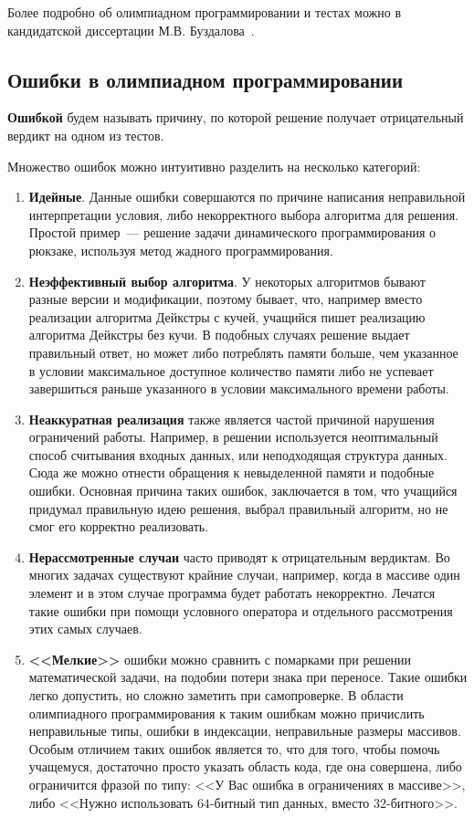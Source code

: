Более подробно об олимпиадном программировании и тестах можно в кандидатской 
диссертации М.В. Буздалова~\cite{buzdalov-diss}.

\subsection{Ошибки в олимпиадном программировании}


\textbf{Ошибкой} будем называть причину, по которой решение получает отрицательный вердикт на одном из тестов.

Множество ошибок можно интуитивно разделить на несколько категорий:
\begin{enumerate}
    \item \textbf{Идейные}. Данные ошибки совершаются по причине написания неправильной интерпретации условия,
        либо некорректного выбора алгоритма для решения. Простой пример~--- решение задачи динамического программирования 
        о рюкзаке, используя метод жадного программирования. 
    \item \textbf{Неэффективный выбор алгоритма}. У некоторых алгоритмов бывают разные версии и модификации,
        поэтому бывает, что, например вместо реализации алгоритма Дейкстры с кучей, учащийся пишет 
        реализацию алгоритма Дейкстры без кучи. В подобных случаях решение выдает правильный ответ, но может
        либо потреблять памяти больше, чем указанное в условии максимальное доступное количество памяти
        либо не успевает завершиться раньше указанного в условии максимального времени работы.
    \item \textbf{Неаккуратная реализация} также является частой причиной нарушения ограничений работы.
        Например, в решении используется неоптимальный способ считывания входных данных, или неподходящая
        структура данных. Сюда же можно отнести обращения к невыделенной памяти и подобные ошибки.
        Основная причина таких ошибок, заключается в том, что учащийся придумал правильную идею решения, 
        выбрал правильный алгоритм, но не смог его корректно реализовать.  
    \item \textbf{Нерассмотренные случаи} часто приводят к отрицательным вердиктам. Во многих задачах существуют крайние случаи,
        например, когда в массиве один элемент и в этом случае программа будет работать некорректно. Лечатся такие ошибки при помощи
        условного оператора и отдельного рассмотрения этих самых случаев.
    \item \textbf{<<Мелкие>>} ошибки можно сравнить с помарками при решении математической задачи, на подобии потери знака при переносе.
        Такие ошибки легко допустить, но сложно заметить при самопроверке. В области олимпиадного программирования к таким ошибкам
        можно причислить неправильные типы, ошибки в индексации, неправильные размеры массивов. Особым отличием таких ошибок
        является то, что для того, чтобы помочь учащемуся, достаточно просто указать область кода, где она совершена, либо
        ограничится фразой по типу: <<У Вас ошибка в ограничениях в массиве>>, либо <<Нужно использовать 
        $64$-битный тип данных, вместо $32$-битного>>.   
\end{enumerate}


